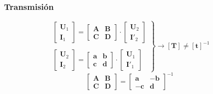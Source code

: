 \subsubsection{Transmisión}
\label{sec:org47212d8}
\[
  \left.
    \begin{array}{l}
  \left[
    \begin{array}{c}
      \mathbf{U}_1\\
      \mathbf{I}_1
    \end{array}
  \right] =
  \left[
    \begin{array}{cc}
      \mathbf{A} & \mathbf{B}\\
      \mathbf{C} & \mathbf{D}
    \end{array}
  \right] \cdot
  \left[
    \begin{array}{c}
      \mathbf{U}_2\\
      \mathbf{I'}_2
    \end{array}
  \right]
      \\ \\
  \left[
    \begin{array}{c}
      \mathbf{U}_2\\
      \mathbf{I}_2
    \end{array}
  \right] =
  \left[
    \begin{array}{cc}
      \mathbf{a} & \mathbf{b}\\
      \mathbf{c} & \mathbf{d}
    \end{array}
  \right] \cdot
  \left[
    \begin{array}{c}
      \mathbf{U}_1\\
      \mathbf{I'}_1
    \end{array}
  \right]
      \end{array}
    \right\}
    \rightarrow
    \boxed{[\mathbf{T}] \neq [\mathbf{t}]^{-1}}
  \]
\[
  \boxed{
    \left[
      \begin{array}{cc}
        \mathbf{A} & \mathbf{B}\\
        \mathbf{C} & \mathbf{D}
      \end{array}\right] = 
      \left[
      \begin{array}{cc}
        \mathbf{a} & \mathbf{-b}\\
        \mathbf{-c} & \mathbf{d}
      \end{array}
      \right]^{-1}
    }
\]
\subsubsection{}
\label{sec:orgf3da70f}

